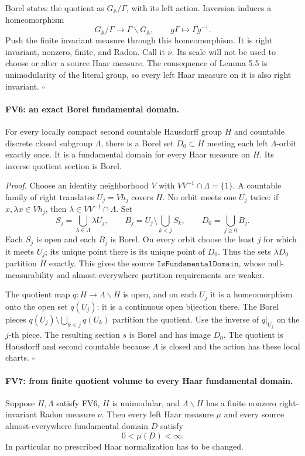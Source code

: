 Borel states the quotient as \(G_{\mathbb A}/\Gamma\), with its
left action.  Inversion induces a homeomorphism
\[
   G_{\mathbb A}/\Gamma\longrightarrow
        \Gamma\backslash G_{\mathbb A},\qquad
        g\Gamma\longmapsto\Gamma g^{-1}.
 \tag{FV.10}
\]
Push the finite invariant measure through this homeomorphism.
It is right invariant, nonzero, finite, and Radon.  Call it \(\nu\).
Its scale will not be used to choose or alter a source Haar measure.
The consequence of Lemma 5.5 is unimodularity of the literal group,
so every left Haar measure on it is also right invariant. \(\square\)

\paragraph{FV6: an exact Borel fundamental domain.}
\label{claim:FV6}
For every locally compact second countable Hausdorff group \(H\)
and countable discrete closed subgroup \(\Lambda\), there is a
Borel set \(D_0\subset H\) meeting each left \(\Lambda\)-orbit
exactly once.  It is a fundamental domain for every Haar measure
on \(H\).  Its inverse quotient section is Borel.

\emph{Proof.}
Choose an identity neighborhood \(V\) with
\(VV^{-1}\cap\Lambda=\{1\}\).  A countable family of right
translates \(U_j=Vh_j\) covers \(H\).  No orbit meets one \(U_j\)
twice: if \(x,\lambda x\in Vh_j\), then
\(\lambda\in VV^{-1}\cap\Lambda\).
Set
\[
 S_j=\bigcup_{\lambda\in\Lambda}\lambda U_j,\qquad
 B_j=U_j\setminus\bigcup_{k<j}S_k,\qquad
 D_0=\bigcup_{j\ge0}B_j.
 \tag{FV.11}
\]
Each \(S_j\) is open and each \(B_j\) is Borel.  On every orbit
choose the least \(j\) for which it meets \(U_j\); its unique point
there is its unique point of \(D_0\).  Thus the sets
\(\lambda D_0\) partition \(H\) exactly.  This gives the source
\(\texttt{IsFundamentalDomain}\), whose null-measurability and
almost-everywhere partition requirements are weaker.

The quotient map \(q:H\to\Lambda\backslash H\) is open, and on
each \(U_j\) it is a homeomorphism onto the open set \(q(U_j)\):
it is a continuous open bijection there.  The Borel pieces
\(q(U_j)\setminus\bigcup_{k<j}q(U_k)\) partition the quotient.
Use the inverse of \(q|_{U_j}\) on the \(j\)-th piece.  The resulting
section \(s\) is Borel and has image \(D_0\).
The quotient is Hausdorff and second countable because \(\Lambda\)
is closed and the action has these local charts. \(\square\)

\paragraph{FV7: from finite quotient volume to every Haar fundamental domain.}
\label{claim:FV7}
Suppose \(H,\Lambda\) satisfy FV6, \(H\) is unimodular, and
\(\Lambda\backslash H\) has a finite nonzero right-invariant Radon
measure \(\nu\).  Then every left Haar measure \(\mu\) and every
source almost-everywhere fundamental domain \(D\) satisfy
\[
                         0<\mu(D)<\infty.
 \tag{FV.12}
\]
In particular no prescribed Haar normalization has to be changed.

